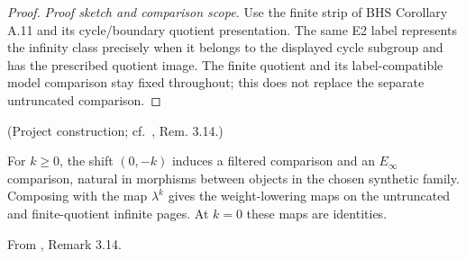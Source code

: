 \begin{proof}
\textit{Proof sketch and comparison scope.}
Use the finite strip of BHS Corollary A.11 and its cycle/boundary quotient
presentation. The same E2 label represents the infinity class precisely
when it belongs to the displayed cycle subgroup and has the prescribed
quotient image. The finite quotient and its label-compatible model
comparison stay fixed throughout; this does not replace the separate
untruncated comparison.
\end{proof}


\begin{proposition}
\label{sem:Literature:infinite-shift}
(Project construction; cf.\ \cite{LWX126}, Rem. 3.14.)\par{}

For $k\ge0$, the shift $(0,-k)$ induces a filtered comparison and an $E_\infty$ comparison, natural in morphisms between objects in the chosen synthetic family. Composing with the map $\lambda^k$ gives the weight-lowering maps on the untruncated and finite-quotient infinite pages. At $k=0$ these maps are identities.

From \cite{LWX126}, Remark 3.14.\par


\end{proposition}
